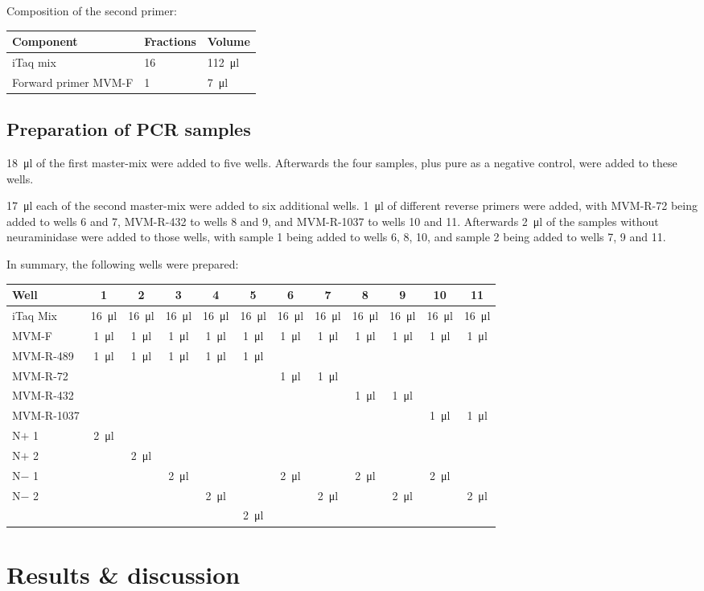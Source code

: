 \documentclass[a4paper,german]{scrreprt}
\begin{document}
Composition of the second primer:
\\

\begin{tabu}{lll}
	\toprule
	Component & Fractions & Volume \\
	\midrule
	iTaq mix & 16 & \SI{112}{\ul} \\
	Forward primer MVM-F & 1 & \SI{7}{\ul} \\
	\bottomrule
\end{tabu}

\section{Preparation of PCR samples}

\SI{18}{\ul} of the first master-mix were added to five wells. Afterwards the
four samples, plus pure  as a negative control, were added to these
wells.

\SI{17}{\ul} each of the second master-mix were added to six additional wells.
\SI{1}{\ul} of different reverse primers were added, with MVM-R-72 being added
to wells 6 and 7, MVM-R-432 to wells 8 and 9, and MVM-R-1037 to wells 10 and
11. Afterwards \SI{2}{\ul} of the samples without neuraminidase were added to
those wells, with sample 1 being added to wells 6, 8, 10, and sample 2 being
added to wells 7, 9 and 11.

In summary, the following wells were prepared:
\\

\begin{tabu}{lccccccccccc}
	\toprule
	Well & 1 & 2 & 3 & 4 & 5 & 6 & 7 & 8 & 9 & 10 & 11 \\
	\midrule 
	iTaq Mix & \SI{16}{\ul} & \SI{16}{\ul} & \SI{16}{\ul} & \SI{16}{\ul} & \SI{16}{\ul} & \SI{16}{\ul} & \SI{16}{\ul} & \SI{16}{\ul} & \SI{16}{\ul} & \SI{16}{\ul} & \SI{16}{\ul} \\
	MVM-F & \SI{1}{\ul} & \SI{1}{\ul} & \SI{1}{\ul} & \SI{1}{\ul} & \SI{1}{\ul} & \SI{1}{\ul} & \SI{1}{\ul} & \SI{1}{\ul} & \SI{1}{\ul} & \SI{1}{\ul} & \SI{1}{\ul} \\
	MVM-R-489 & \SI{1}{\ul} & \SI{1}{\ul} & \SI{1}{\ul} & \SI{1}{\ul} & \SI{1}{\ul} &  &  &  &  &  &  \\
	MVM-R-72 & & & & & & \SI{1}{\ul} & \SI{1}{\ul} & & & & \\
	MVM-R-432 & & & & & & & & \SI{1}{\ul} & \SI{1}{\ul} & & \\
	MVM-R-1037 & & & & & & & & & & \SI{1}{\ul} & \SI{1}{\ul} \\
	N$+$ 1 & \SI{2}{\ul} & & & & & & & & & & \\
	N$+$ 2 & & \SI{2}{\ul} & & & & & & & & & \\
	N$-$ 1 & & & \SI{2}{\ul} & & & \SI{2}{\ul} & & \SI{2}{\ul} & & \SI{2}{\ul} & \\
	N$-$ 2 & & & & \SI{2}{\ul} & & & \SI{2}{\ul} & & \SI{2}{\ul} & & \SI{2}{\ul} \\
	 & & & & & \SI{2}{\ul} & & & & & & \\
	\bottomrule
\end{tabu}

\chapter{Results \& discussion}



\end{document}
